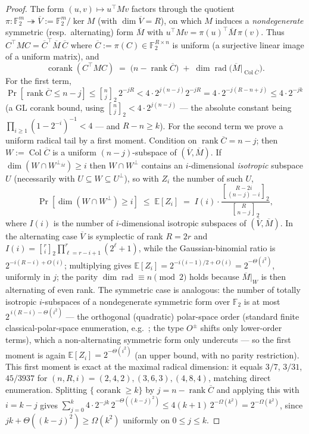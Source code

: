 \documentclass[11pt,a4paper]{article}
\theoremstyle{plain}
\theoremstyle{definition}
\newcommand{\F}{\mathbb{F}}
\newcommand{\E}{\mathbb{E}}
\begin{document}
\begin{proof}
The form $(u,v)\mapsto u^{\top}Mv$ factors through the quotient $\pi:\F_2^m \twoheadrightarrow \overline V := \F_2^m/\ker M$ (with $\dim \overline V = R$), on which $M$ induces a \emph{nondegenerate} symmetric (resp.\ alternating) form $\overline M$ with $u^{\top}Mv = \pi(u)^{\top}\overline M\,\pi(v)$. Thus $C^{\top}MC = \overline C^{\top}\overline M\,\overline C$ where $\overline C := \pi(C) \in \F_2^{R \times n}$ is uniform (a surjective linear image of a uniform matrix), and
\[
\operatorname{corank}(C^{\top}MC) \;=\; \bigl(n - \operatorname{rank}\overline C\bigr) \;+\; \dim\operatorname{rad}\!\bigl(\overline M|_{\operatorname{Col}\overline C}\bigr).
\]
For the first term, $\Pr[\operatorname{rank}\overline C \le n-j] \le {n \brack j}_2\, 2^{-jR} < 4\cdot 2^{j(n-j)}2^{-jR} = 4\cdot 2^{-j(R-n+j)} \le 4\cdot 2^{-jk}$ (a $\mathrm{GL}$ corank bound, using ${n \brack j}_2 < 4\cdot 2^{j(n-j)}$ --- the absolute constant being $\prod_{i\ge 1}(1-2^{-i})^{-1} < 4$ --- and $R-n \ge k$). For the second term we prove a uniform radical tail by a first moment. Condition on $\operatorname{rank}\overline C = n-j$; then $W := \operatorname{Col}\overline C$ is a uniform $(n-j)$-subspace of $(\overline V, \overline M)$. If $\dim(W\cap W^{\perp_{\overline M}})\ge i$ then $W\cap W^{\perp}$ contains an $i$-dimensional \emph{isotropic} subspace $U$ (necessarily with $U\subseteq W\subseteq U^{\perp}$), so with $Z_i$ the number of such $U$,
\[
\Pr[\dim(W\cap W^{\perp})\ge i] \;\le\; \E[Z_i] \;=\; I(i)\cdot\frac{{R-2i \brack (n-j)-i}_2}{{R \brack n-j}_2},
\]
where $I(i)$ is the number of $i$-dimensional isotropic subspaces of $(\overline V, \overline M)$. In the alternating case $\overline V$ is symplectic of rank $R=2r$ and $I(i)={r\brack i}_2\prod_{\ell=r-i+1}^{r}(2^{\ell}+1)$, while the Gaussian-binomial ratio is $2^{-i(R-i)+O(i)}$; multiplying gives $\E[Z_i]=2^{-i(i-1)/2+O(i)}=2^{-\Theta(i^2)}$, uniformly in $j$; the parity $\dim\operatorname{rad}\equiv n\pmod 2$ holds because $\overline M|_W$ is then alternating of even rank. The symmetric case is analogous: the number of totally isotropic $i$-subspaces of a nondegenerate symmetric form over $\F_2$ is at most $2^{\,i(R-i)-\Theta(i^2)}$ --- the orthogonal (quadratic) polar-space order (standard finite classical-polar-space enumeration, e.g.\ \cite{BCN89}; the type $O^{\pm}$ shifts only lower-order terms), which a non-alternating symmetric form only undercuts --- so the first moment is again $\E[Z_i]=2^{-\Theta(i^2)}$ (an upper bound, with no parity restriction). This first moment is exact at the maximal radical dimension: it equals $3/7$, $3/31$, $45/3937$ for $(n,R,i)=(2,4,2),(3,6,3),(4,8,4)$, matching direct enumeration. Splitting $\{\operatorname{corank}\ge k\}$ by $j = n-\operatorname{rank}\overline C$ and applying this with $i=k-j$ gives $\sum_{j=0}^{k} 4\cdot 2^{-jk}\,2^{-\Theta((k-j)^2)} \le 4(k+1)\,2^{-\Omega(k^2)} = 2^{-\Omega(k^2)}$, since $jk + \Theta((k-j)^2) \ge \Omega(k^2)$ uniformly on $0 \le j \le k$.
\end{proof}
\end{document}
